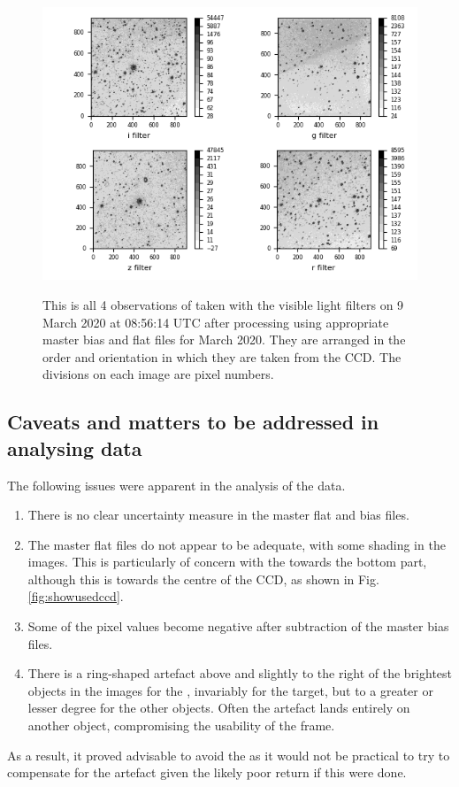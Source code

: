 \begin{figure}[!htbp]
\begin{center}
\includegraphics[scale=1]{images/init4example20.png}
\end{center}   
\caption{This is all 4 observations of {\prox} taken with the visible light
filters on 9 March 2020 at 08:56:14 UTC after processing using
appropriate master bias and flat files for March 2020. They are arranged in
the order and orientation in which they are taken from the CCD. The
divisions on each image are pixel numbers.}
\protect\label{fig:init4example20}
\end{figure}

\clearpage

\subsection{Caveats and matters to be addressed in analysing data}
\protect\label{section:mattersaddressed}

The following issues were apparent in the analysis of the data.

\begin{enumerate}
  \item There is no clear uncertainty measure in the master flat and bias files.
  \item The master flat files do not appear to be adequate, with some shading in
  	the images. This is particularly of concern with the {\gfilter}
  	towards the bottom part, although this is towards the centre of the CCD, as
  	shown in Fig. \ref{fig:showusedccd}.
  \item Some of the pixel values become negative after subtraction of the master
  	bias files.
  \item There is a ring-shaped artefact above and slightly to the right of the
  	brightest objects in the images for the {\zfilter}, invariably for
	the target, but to a greater or lesser degree for the other objects. Often the
	artefact lands entirely on another object, compromising the usability of the
	frame.
\end{enumerate}

As a result, it proved advisable to avoid the {\zfilter} as it would not
be practical to try to compensate for the artefact given the likely poor return
if this were done.

